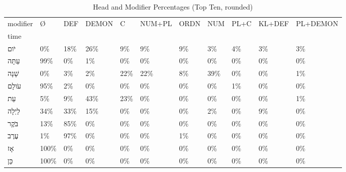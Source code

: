 \begin{table}[htbp!]
\centering
\caption{Head and Modifier Percentages (Top Ten, rounded)}
\label{table:pos_modi_pc}
\begin{adjustbox}{width=1\textwidth}
\begin{tabular}{lllllllllll}
\toprule
modifier &     Ø &  DEF & DEMON &    C & NUM+PL & ORDN &  NUM & PL+C & KL+DEF & PL+DEMON \\
time                 &       &      &       &      &        &      &      &      &        &          \\
\midrule
\texthebrew{יֹום}    &    0\% &  18\% &   26\% &   9\% &     9\% &   9\% &   3\% &   4\% &     3\% &       3\% \\
\texthebrew{עַתָּה}  &   99\% &   0\% &    1\% &   0\% &     0\% &   0\% &   0\% &   0\% &     0\% &       0\% \\
\texthebrew{שָׁנָה}  &    0\% &   3\% &    2\% &  22\% &    22\% &   8\% &  39\% &   0\% &     0\% &       1\% \\
\texthebrew{עֹולָם}  &   95\% &   2\% &    0\% &   0\% &     0\% &   0\% &   0\% &   1\% &     0\% &       0\% \\
\texthebrew{עֵת}     &    5\% &   9\% &   43\% &  23\% &     0\% &   0\% &   0\% &   0\% &     0\% &       1\% \\
\texthebrew{לַיְלָה} &   34\% &  33\% &   15\% &   0\% &     0\% &   0\% &   2\% &   0\% &     9\% &       0\% \\
\texthebrew{בֹּקֶר}  &   13\% &  85\% &    0\% &   0\% &     0\% &   0\% &   0\% &   0\% &     0\% &       0\% \\
\texthebrew{עֶרֶב}   &    1\% &  97\% &    0\% &   0\% &     0\% &   1\% &   0\% &   0\% &     0\% &       0\% \\
\texthebrew{אָז}     &  100\% &   0\% &    0\% &   0\% &     0\% &   0\% &   0\% &   0\% &     0\% &       0\% \\
\texthebrew{כֵּן}    &  100\% &   0\% &    0\% &   0\% &     0\% &   0\% &   0\% &   0\% &     0\% &       0\% \\
\bottomrule
\end{tabular}
\end{adjustbox}
\end{table}
